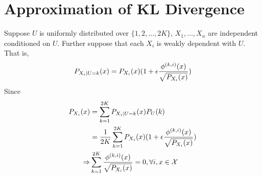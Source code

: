 \documentclass{article}
\theoremstyle{definition}
\begin{document}
\section{Approximation of KL Divergence}\label{sec:akld}
Suppose $U$ is uniformly distributed over $\{1, 2,\dots, 2K\}$, $X_1, \dots, X_n$ are independent conditioned on $U$.
Further suppose that each $X_i$ is weakly dependent with $U$.  That is, 
$$
P_{X_i | U=k}(x) = P_{X_i} (x)( 1 + \epsilon {\phi^{(k,i)}(x ) \over \sqrt{P_{X_i}(x)}} )
$$
Since 
\begin{align*}
P_{X_i}(x) &= \sum_{k=1}^{2K} P_{X_i | U=k}(x) P_U(k) \\
& = {1 \over 2K} \sum_{k=1}^{2K}P_{X_i} (x)( 1 + \epsilon {\phi^{(k,i)}(x ) \over \sqrt{P_{X_i}(x)}} )\\
\Rightarrow & \sum_{k=1}^{2K} {\phi^{(k, i)}(x) \over \sqrt{P_{X_i}(x)}} =0,\forall i, x\in \mathcal{X}
\end{align*}
\end{document}
